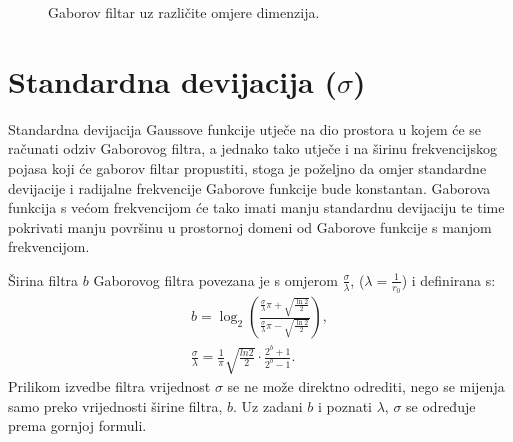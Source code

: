 \documentclass[12pt,a4paper]{ReportAA}
\begin{document}
\begin{figure}[h!tb]
\centering
{}
\hspace{50pt}
\caption{Gaborov filtar uz različite omjere dimenzija.}
\label{fig:filter-ratios}
\end{figure}

\section{Standardna devijacija ($\sigma$)}
Standardna devijacija Gaussove funkcije utječe na dio prostora u kojem će se
računati odziv Gaborovog filtra, a jednako tako utječe i na širinu
frekvencijskog pojasa koji će gaborov filtar propustiti, stoga je poželjno da
omjer standardne devijacije i radijalne frekvencije Gaborove funkcije bude
konstantan. Gaborova funkcija s većom frekvencijom će tako imati
manju standardnu devijaciju te time pokrivati manju površinu u prostornoj domeni
od Gaborove funkcije s manjom frekvencijom. 

Širina filtra $b$ Gaborovog filtra povezana je s omjerom
$\frac{\sigma}{\lambda}$, ($\lambda = \frac{1}{r_0}$) i definirana s:
\begin{eqnarray}
b = \log_2{\left ( \frac{\frac{\sigma}{\lambda}\pi + \sqrt{\frac{\ln2}{2}}}
{\frac{\sigma}{\lambda}\pi - \sqrt{\frac{\ln2}{2}}} \right )}, \\
\frac{\sigma}{\lambda} =
\frac{1}{\pi}\sqrt{\frac{ln2}{2}}\cdot\frac{2^b+1}{2^b-1}.
\end{eqnarray}
Prilikom izvedbe filtra vrijednost $\sigma$ se ne može direktno
odrediti, nego se mijenja samo preko vrijednosti širine filtra,
$b$. Uz zadani $b$ i poznati $\lambda$, $\sigma$ se određuje prema gornjoj
formuli.
 
\end{document}
